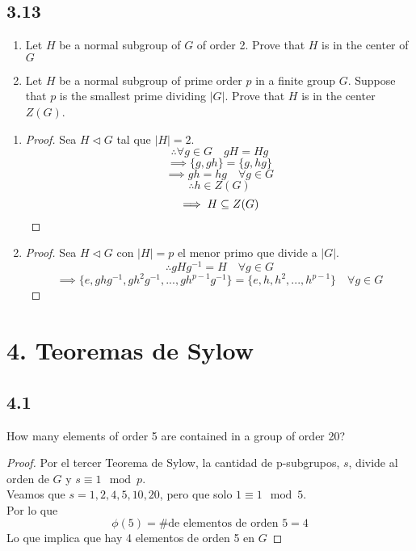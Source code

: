 \documentclass[11pt]{article}
\theoremstyle{definition}
\begin{document}
        \subsection{3.13}
        \begin{enumerate}[label=\textbf{(\alph*)}]
            \item Let $H$ be a normal subgroup of $G$ of order 2. Prove that $H$ is in the center of $G$

            \item Let $H$ be a normal subgroup of prime order $p$ in a finite group $G$. Suppose that $p$ is the smallest prime dividing $|G|$. Prove that $H$ is in the center $Z(G)$.
        \end{enumerate}
        \begin{enumerate}[label=\textbf{(\alph*)}]
            \item \begin{proof}
                Sea $H\triangleleft G$ tal que $|H|=2$.
                \[\therefore \forall g\in G\quad gH=Hg\]
                \[\implies \{g,gh\}=\{g,hg\}\]
                \[\implies gh=hg\quad\forall g\in G\]
                \[\therefore h\in Z(G)\]
                \[\implies H\subseteq Z(G)\qedhere\]
            \end{proof}

            \item \begin{proof}
                Sea $H\triangleleft G$ con $|H|=p$ el menor primo que divide a $|G|$.
                \[\therefore gHg^{-1}=H\quad\forall g\in G\]
                \[\implies \{e,ghg^{-1},gh^2g^{-1},...,gh^{p-1}g^{-1}\}=\{e,h,h^2,...,h^{p-1}\}\quad\forall g\in G\]
            \end{proof}
        \end{enumerate}

        \section{4. Teoremas de Sylow}
        \subsection{4.1}
        How many elements of order 5 are contained in a group of order 20?
        \begin{proof}
            Por el tercer Teorema de Sylow, la cantidad de p-subgrupos, $s$, divide al orden de $G$ y $s\equiv 1\mod p$.\\
            Veamos que $s=1,2,4,5,10,20$, pero que solo $1\equiv 1\mod 5$.\\
            Por lo que
            \[\phi(5)=\textrm{\# de elementos de orden 5}=4\]
            Lo que implica que hay 4 elementos de orden 5 en $G$
        \end{proof}
\end{document}
